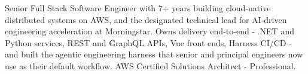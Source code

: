 
\begin{cvparagraph}

Senior Full Stack Software Engineer with 7+ years building cloud-native distributed systems on AWS, and the designated technical lead for AI-driven engineering acceleration at Morningstar. Owns delivery end-to-end - .NET and Python services, REST and GraphQL APIs, Vue front ends, Harness CI/CD - and built the agentic engineering harness that senior and principal engineers now use as their default workflow. AWS Certified Solutions Architect - Professional.

\end{cvparagraph}
